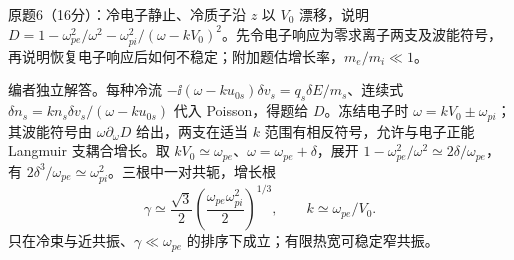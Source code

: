 \begin{exercise}\label{ex:hist02-mid-6}
原题6（16分）：冷电子静止、冷质子沿 $z$ 以 $V_0$ 漂移，说明 $D=1-\omega_{pe}^2/\omega^2-\omega_{pi}^2/(\omega-kV_0)^2$。先令电子响应为零求离子两支及波能符号，再说明恢复电子响应后如何不稳定；附加题估增长率，$m_e/m_i\ll1$。
\end{exercise}
\begin{solution}
编者独立解答。每种冷流 $-\ii(\omega-ku_{0s})\delta v_s=q_s\delta E/m_s$、连续式 $\delta n_s=k n_s\delta v_s/(\omega-ku_{0s})$ 代入 Poisson，得题给 $D$。冻结电子时 $\omega=kV_0\pm\omega_{pi}$；其波能符号由 $\omega\partial_\omega D$ 给出，两支在适当 $k$ 范围有相反符号，允许与电子正能 Langmuir 支耦合增长。取 $kV_0\simeq\omega_{pe}$、$\omega=\omega_{pe}+\delta$，展开 $1-\omega_{pe}^2/\omega^2\simeq2\delta/\omega_{pe}$，有 $2\delta^3/\omega_{pe}\simeq\omega_{pi}^2$。三根中一对共轭，增长根
\begin{equation}\gamma\simeq\frac{\sqrt3}{2}\left(\frac{\omega_{pe}\omega_{pi}^2}{2}\right)^{1/3},\qquad k\simeq\omega_{pe}/V_0.
\end{equation}
只在冷束与近共振、$\gamma\ll\omega_{pe}$ 的排序下成立；有限热宽可稳定窄共振。
\end{solution}
